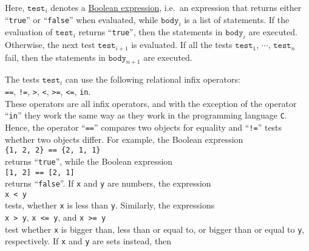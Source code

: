 Here,  $\texttt{test}_i$ denotes a \href{https://en.wikipedia.org/wiki/Boolean_expression}{Boolean expression}, 
i.e.~an expression that returns either ``\texttt{true}'' or ``\texttt{false}'' when evaluated, while
$\texttt{body}_i$ is a list of statements.  If the
evaluation of $\texttt{test}_i$ returns ``\texttt{true}'', then the statements in $\texttt{body}_i$ are
executed.  Otherwise, the next test $\texttt{test}_{i+1}$ is evaluated.  If all the tests $\texttt{test}_1$, $\cdots$, $\texttt{test}_n$ 
fail, then the statements in $\texttt{body}_{n+1}$ are executed.
 
The tests $\texttt{test}_i$ can use the following relational infix operators:
\\[0.2cm]
\hspace*{1.3cm}
\texttt{==}, \quad
\texttt{!=}, \quad
\texttt{>},  \quad
\texttt{<},  \quad
\texttt{>=}, \quad
\texttt{<=}, \quad
\texttt{in}. \quad
\\[0.2cm]
These operators are all infix operators, and with the exception of the operator ``\texttt{in}'' they work the
same way as they work in the programming language \texttt{C}.  Hence,
the operator ``\texttt{==}'' compares two objects for equality and ``\texttt{!=}'' tests whether two objects
differ.  For example, the Boolean expression
\\[0.2cm]
\hspace*{1.3cm}
\texttt{\{1, 2, 2\} == \{2, 1, 1\}}
\\[0.2cm]
returns ``\texttt{true}'', while the Boolean expression
\\[0.2cm]
\hspace*{1.3cm}
\texttt{[1, 2] == [2, 1]}
\\[0.2cm]
returns ``\texttt{false}''.  If \texttt{x} and \texttt{y} are numbers, the expression
\\[0.2cm]
\hspace*{1.3cm}
\texttt{x < y}
\\[0.2cm]
tests, whether \texttt{x} is less than \texttt{y}.  Similarly, the expressions
\\[0.2cm]
\hspace*{1.3cm}
\texttt{x > y}, \quad \texttt{x <= y}, \quad and \quad \texttt{x >= y}
\\[0.2cm]
test whether \texttt{x} is bigger than, less than or equal to, or bigger than or equal to \texttt{y}, respectively.
If \texttt{x} and \texttt{y} are sets instead, then
